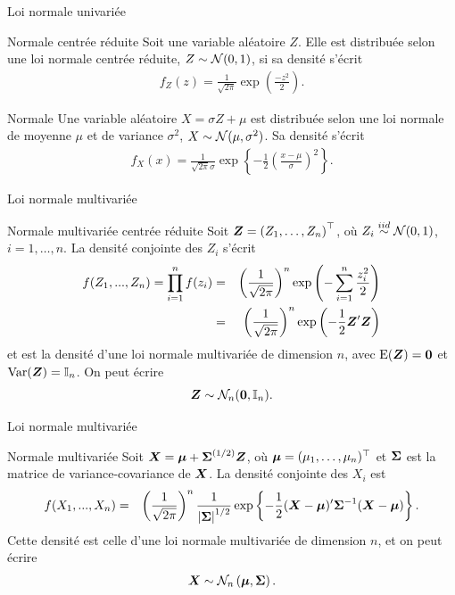 \documentclass{BeamerAAV}
\begin{document}
\begin{frame}{Loi normale univariée}
\begin{bte}{Normale centrée réduite}
    Soit une variable aléatoire $Z$. Elle est distribuée selon une loi normale centrée réduite, $Z\sim\mathcal{N}(0,1)$, si sa densité s'écrit 
\begin{eqnarray*}
 f_Z(z) = \frac{1}{\sqrt{2\pi}} \exp\left( \frac{-z^2}{2}\right).
\end{eqnarray*}
\end{bte}
\begin{bte}{Normale }
    Une variable aléatoire $X = \sigma Z + \mu$ est distribuée selon une loi normale de moyenne $\mu$ et de variance $\sigma^2$, $X\sim\mathcal{N}(\mu, \sigma^2)$. Sa densité s'écrit 
\begin{eqnarray*}
	f_X(x) =  \frac{1}{\sqrt{2\pi} \sigma} \exp\left\{-\frac{1}{2} \left(\frac{x- \mu}{\sigma}\right)^2\right\}.
\end{eqnarray*}

\end{bte}
\end{frame}

\begin{frame}{Loi normale multivariée}
\begin{bte}{Normale multivariée centrée réduite}
 Soit $\mbox{\boldmath$Z$\unboldmath}=\left( Z_1, \dots, Z_n \right)^\top$, où $Z_i \overset{iid}{\sim} \mathcal{N}(0,1)$, $i=1, \dots, n$. La densité conjointe des $Z_i$ s'écrit
\begin{eqnarray*}
 f(Z_1, ..., Z_n) = \prod_{i=1}^n f(z_i)
  &=& \left(\frac{1}{\sqrt{2\pi}}\right)^n \exp\left(-\sum_{i=1}^n \frac{z_i^2}{2}\right)\nonumber\\
 &=& \left(\frac{1}{\sqrt{2\pi}}\right)^n \exp\left(-\frac{1}{2} \mbox{\boldmath$Z$\unboldmath}'\mbox{\boldmath$Z$\unboldmath}\right)
\end{eqnarray*}
et est la densité d'une loi normale multivariée de dimension $n$, avec $\mathrm{E}(\mbox{\boldmath$Z$\unboldmath}) = \mbox{\boldmath$0$\unboldmath}$ et $\mathrm{Var}(\mbox{\boldmath$Z$\unboldmath}) = \mathbb{I}_n$. On peut écrire
$$\mbox{\boldmath$Z$\unboldmath}\sim \mathcal{N}_n (\textbf{0}, \mbox{\boldmath$\mathbb{I}$\unboldmath}_n).$$
\end{bte}
\end{frame}


\begin{frame}{Loi normale multivariée}
\begin{bte}{Normale multivariée}
    Soit $\mbox{\boldmath$X$\unboldmath}=\mbox{\boldmath$\mu$\unboldmath} + \mbox{\boldmath$\Sigma$\unboldmath}^{(1/2)}\mbox{\boldmath$Z$\unboldmath}$, où $\mbox{\boldmath$\mu$\unboldmath} = (\mu_1,\dots, \mu_n)^\top$ et $\mbox{\boldmath$\Sigma$\unboldmath}$ est la matrice de variance-covariance de $\mbox{\boldmath$X$\unboldmath}$.
    La densité conjointe des $X_i$ est 
\begin{eqnarray*}
f(X_1, ..., X_n) &=&  \left(\frac{1}{\sqrt{2\pi}}\right)^n \frac{1}{\left|\mbox{\boldmath$\Sigma$\unboldmath}\right|^{1/2}} \exp\left\{-\frac{1}{2} (\mbox{\boldmath$X$\unboldmath}- \mbox{\boldmath$\mu$\unboldmath})' \mbox{\boldmath$\Sigma$\unboldmath}^{-1} (\mbox{\boldmath$X$\unboldmath}- \mbox{\boldmath$\mu$\unboldmath})\right\}.
\end{eqnarray*}
Cette densité est celle d'une loi normale multivariée de dimension $n$, et on peut écrire
\begin{eqnarray*}
\mbox{\boldmath$X$\unboldmath}\sim \mathcal{N}_n \left(\mbox{\boldmath$\mu$\unboldmath}, \mbox{\boldmath$\Sigma$\unboldmath}\right) .
\end{eqnarray*}
\end{bte}
\end{frame}
\end{document}
